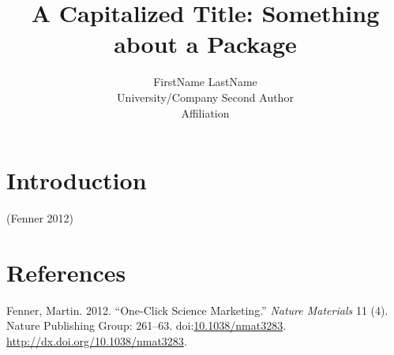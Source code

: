\documentclass[article]{jss}
\author{
FirstName LastName\\University/Company \And Second Author\\Affiliation
}
\title{A Capitalized Title: Something about a Package \pkg{foo}}
\begin{document}
\section{Introduction}\label{introduction}

(Fenner 2012)

\section*{References}\label{references}

Fenner, Martin. 2012. ``One-Click Science Marketing.'' \emph{Nature
Materials} 11 (4). Nature Publishing Group: 261--63.
doi:\href{http://dx.doi.org/10.1038/nmat3283}{10.1038/nmat3283}.
\url{http://dx.doi.org/10.1038/nmat3283}.
\end{document}
